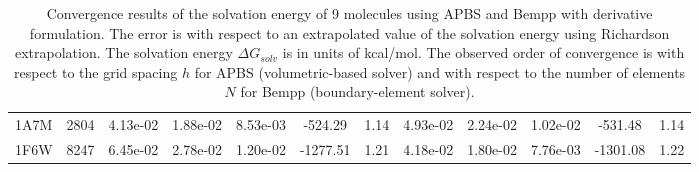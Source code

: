 \documentclass[12pt]{article}
\begin{document}
\begin{table*}[]
{\begin{tabular}{cc|ccc|cc|ccc|cc}
    1A7M & 2804 & 4.13e-02 & 1.88e-02 & 8.53e-03 & -524.29                            & 1.14                   & 4.93e-02 & 2.24e-02 & 1.02e-02 & -531.48                            & 1.14                   \\
    1F6W & 8247 & 6.45e-02 & 2.78e-02 & 1.20e-02 & -1277.51                           & 1.21                   & 4.18e-02 & 1.80e-02 & 7.76e-03 & -1301.08                           & 1.22                     
    \end{tabular}
    }
    \caption{Convergence results of the solvation energy of 9 molecules using APBS and Bempp with derivative formulation.
    The error is with respect to an extrapolated value of the solvation energy using Richardson extrapolation.
    The solvation energy $\Delta G_{solv}$ is in units of kcal/mol.
    The observed order of convergence is with respect to the grid spacing $h$ for APBS (volumetric-based solver) and with respect to the number of elements $N$ for Bempp (boundary-element solver).}
    \label{tab:APBS_result}
\end{table*}

{}

\end{document}
